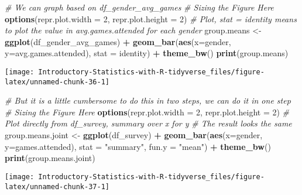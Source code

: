 \documentclass[
]{book}
\newenvironment{Shaded}{\begin{snugshade}}{\end{snugshade}}
\newcommand{\CommentTok}[1]{\textcolor[rgb]{0.56,0.35,0.01}{\textit{#1}}}
\newcommand{\DataTypeTok}[1]{\textcolor[rgb]{0.13,0.29,0.53}{#1}}
\newcommand{\DecValTok}[1]{\textcolor[rgb]{0.00,0.00,0.81}{#1}}
\newcommand{\KeywordTok}[1]{\textcolor[rgb]{0.13,0.29,0.53}{\textbf{#1}}}
\newcommand{\NormalTok}[1]{#1}
\newcommand{\OperatorTok}[1]{\textcolor[rgb]{0.81,0.36,0.00}{\textbf{#1}}}
\newcommand{\StringTok}[1]{\textcolor[rgb]{0.31,0.60,0.02}{#1}}
\begin{document}
\begin{Shaded}
\begin{Highlighting}[]
\CommentTok{\# We can graph based on df\_gender\_avg\_games}
\CommentTok{\# Sizing the Figure Here}
\KeywordTok{options}\NormalTok{(}\DataTypeTok{repr.plot.width =} \DecValTok{2}\NormalTok{, }\DataTypeTok{repr.plot.height =} \DecValTok{2}\NormalTok{)}
\CommentTok{\# Plot, stat = identity means to plot the value in avg.games.attended for each gender}
\NormalTok{group.means \textless{}{-}}\StringTok{ }\KeywordTok{ggplot}\NormalTok{(df\_gender\_avg\_games) }\OperatorTok{+}
\StringTok{    }\KeywordTok{geom\_bar}\NormalTok{(}\KeywordTok{aes}\NormalTok{(}\DataTypeTok{x=}\NormalTok{gender, }\DataTypeTok{y=}\NormalTok{avg.games.attended), }\DataTypeTok{stat =} \StringTok{\textquotesingle{}identity\textquotesingle{}}\NormalTok{) }\OperatorTok{+}
\StringTok{    }\KeywordTok{theme\_bw}\NormalTok{()}
\KeywordTok{print}\NormalTok{(group.means)}
\end{Highlighting}
\end{Shaded}

\begin{center}\texttt{[image: Introductory-Statistics-with-R-tidyverse\_files/figure-latex/unnamed-chunk-36-1]} \end{center}

\begin{Shaded}
\begin{Highlighting}[]
\CommentTok{\# But it is a little cumbersome to do this in two steps, we can do it in one step}
\CommentTok{\# Sizing the Figure Here}
\KeywordTok{options}\NormalTok{(}\DataTypeTok{repr.plot.width =} \DecValTok{2}\NormalTok{, }\DataTypeTok{repr.plot.height =} \DecValTok{2}\NormalTok{)}
\CommentTok{\# Plot directly from df\_survey, summary over x for y}
\CommentTok{\# The result looks the same}
\NormalTok{group.means.joint \textless{}{-}}\StringTok{ }\KeywordTok{ggplot}\NormalTok{(df\_survey) }\OperatorTok{+}
\StringTok{    }\KeywordTok{geom\_bar}\NormalTok{(}\KeywordTok{aes}\NormalTok{(}\DataTypeTok{x=}\NormalTok{gender, }\DataTypeTok{y=}\NormalTok{games.attended), }\DataTypeTok{stat =} \StringTok{"summary"}\NormalTok{, }\DataTypeTok{fun.y =} \StringTok{"mean"}\NormalTok{) }\OperatorTok{+}
\StringTok{    }\KeywordTok{theme\_bw}\NormalTok{()}
\KeywordTok{print}\NormalTok{(group.means.joint)}
\end{Highlighting}
\end{Shaded}

\begin{center}\texttt{[image: Introductory-Statistics-with-R-tidyverse\_files/figure-latex/unnamed-chunk-37-1]} \end{center}
\end{document}
